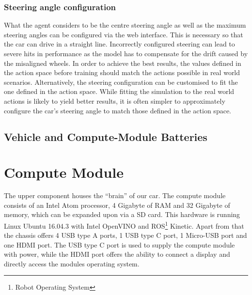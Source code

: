 \subsubsection{Steering angle configuration}
What the agent considers to be the centre steering angle as well as the maximum steering angles can be configured via the web interface. This is necessary so that the car can drive in a straight line. Incorrectly configured steering can lead to severe hits in performance as the model has to compensate for the drift caused by the misaligned wheels. In order to achieve the best results, the values defined in the action space before training should match the actions possible in real world scenarios. Alternatively, the steering configuration can be customised to fit the one defined in the action space. While fitting the simulation to the real world actions is likely to yield better results, it is often simpler to approximately configure the car's steering angle to match those defined in the action space.

\subsection{Vehicle and Compute-Module Batteries}

\section{Compute Module}
The upper component houses the ``brain'' of our car. The compute module consists of an Intel Atom
processor, 4 Gigabyte of RAM and 32 Gigabyte of memory, which can be expanded upon via a SD card. This hardware is running Linux Ubuntu 16.04.3 with Intel OpenVINO\texttrademark{} and ROS\footnote{Robot Operating System} Kinetic. Apart from that the chassis offers 4 USB type A ports, 1 USB type C port, 1 Micro-USB port and one HDMI port. The USB type C port is used to supply the compute module with power, while the HDMI port offers the ability to connect a display and directly access the modules operating system.

